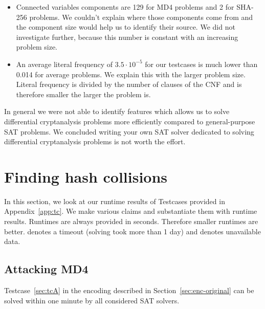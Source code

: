 \begin{itemize}
  \item Connected variables components are 129 for MD4 problems and 2 for SHA-256
    problems. We couldn't explain where those components come from and the
    component size would help us to identify their source. We did not investigate
    further, because this number is constant with an increasing problem size.

  \item An average literal frequency of $3.5\cdot 10^{-5}$ for our testcases
    is much lower than 0.014 for average problems. We explain this with the
    larger problem size. Literal frequency is divided by the number of clauses
    of the CNF and is therefore smaller the larger the problem is.
\end{itemize}

In general we were not able to identify features which allows us to solve
differential cryptanalysis problems more efficiently compared to
general-purpose SAT problems. We concluded writing your own SAT solver
dedicated to solving differential cryptanalysis problems is not worth
the effort.

\section{Finding hash collisions}
\label{sec:results-attacks}
%
In this section, we look at our runtime results of Testcases provided in
Appendix~\ref{app:tc}. We make various claims and substantiate them
with runtime results. Runtimes are always provided in seconds. Therefore
smaller runtimes are better. \timeout{} denotes a timeout (solving took
more than 1 day) and \unknown{} denotes unavailable data.


\subsection{Attacking MD4}
\label{sec:results-md4}
%
\begin{prop}
  Testcase~\ref{sec:tcA} in the encoding described in Section~\ref{sec:enc-original}
  can be solved within one minute by all considered SAT solvers.
\end{prop}

